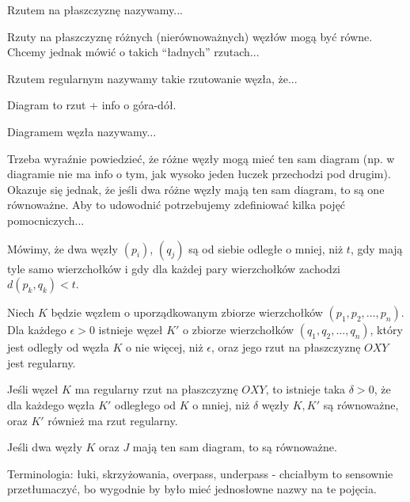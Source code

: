 \begin{definicja}
 Rzutem na płaszczyznę nazywamy...
\end{definicja}

Rzuty na płaszczyznę różnych (nierównoważnych) węzłów mogą być równe. Chcemy jednak mówić o takich ``ładnych'' rzutach...

\begin{definicja}
 Rzutem regularnym nazywamy takie rzutowanie węzła, że...
\end{definicja}

Diagram to rzut + info o góra-dół.

\begin{definicja}
 Diagramem węzła nazywamy...
\end{definicja}

Trzeba wyraźnie powiedzieć, że różne węzły mogą mieć ten sam diagram (np. w diagramie nie ma info o tym, jak wysoko jeden łuczek przechodzi pod drugim). 
Okazuje się jednak, że jeśli dwa różne węzły mają ten sam diagram, to są one równoważne. Aby to udowodnić potrzebujemy zdefiniować kilka pojęć pomocniczych...


\begin{definicja}
 Mówimy, że dwa węzły $(p_i)$, $(q_j)$ są od siebie odległe o mniej, niż $t$, gdy mają tyle samo wierzchołków i gdy dla każdej pary wierzchołków zachodzi $d(p_k,q_k) < t$.
\end{definicja}

\begin{twierdzenie}
 Niech $K$ będzie węzłem o uporządkowanym zbiorze wierzchołków $(p_1, p_2, \ldots, p_n)$. Dla każdego $\epsilon > 0$ istnieje węzeł $K'$ o zbiorze wierzchołków $(q_1, q_2, \ldots, q_n)$, 
który jest odległy od węzła $K$ o nie więcej, niż $\epsilon$, oraz jego rzut na płaszczyznę $OXY$ jest regularny. 
\end{twierdzenie}

\begin{twierdzenie}
 Jeśli węzeł $K$ ma regularny rzut na płaszczyznę $OXY$, to istnieje taka $\delta>0$, że dla każdego węzła $K'$ odległego od $K$ o mniej, niż $\delta$ węzły $K, K'$ są równoważne,
 oraz $K'$ również ma rzut regularny. 
\end{twierdzenie}

\begin{twierdzenie}
 Jeśli dwa węzły $K$ oraz $J$ mają ten sam diagram, to są równoważne.
\end{twierdzenie}

Terminologia: łuki, skrzyżowania, overpass, underpass - chciałbym to sensownie przetłumaczyć, bo wygodnie by było mieć jednosłowne nazwy na te pojęcia.

